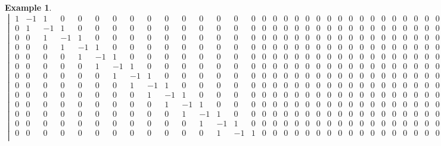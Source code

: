 \documentclass{article}
\newtheorem*{Definition: Sylvester Matrix}{Definition}
\newtheorem*{Definition: Resultant 1}{Definition 1}
\newtheorem*{Definition: Resultant 2}{Definition 2}
\newtheorem*{Theorem: Resultant proves shared roots}{Theorem 1}
\newtheorem*{Theorem: Minimal polynomial for beta}{Theorem 2}
\newtheorem*{Example: Sylvester Matrix Ex}{Example}
\newtheorem*{Theorem: Roots}{Theorem}
\newtheorem*{Corollary: Discriminant}{Corollary}
\newtheorem*{Theorem: Rational Root Theorem}{Theorem}
\newtheorem*{Corollary: Cubic Irreducibility}{Corollary}
\newtheorem*{Theorem: Eisenstein Criterion}{Theorem}
\newtheorem*{Theorem: mod p Test}{Theorem}
\newtheorem*{Theorem: Rabin's algorithm}{Theorem}
\newtheorem*{Theorem: gcd finite field}{Theorem}
\newtheorem*{Theorem: Gauss Irreducibles}{Theorem}
\newtheorem*{Theorem: Number of irreducibles}{Theorem}
\newtheorem*{Example: All irreducibles in Z_2}{Example}
\newtheorem*{Formula: Minimal polynomial for r root of a}{Formula 1}
\newtheorem*{Example: minimal polynomial for sqrt(p)}{Example}
\newtheorem*{Example: Golden Ratio}{Example}
\newtheorem*{Formula: Minimal polynomial for a+b}{Formula 2}
\newtheorem*{Example: 1 + sqrt(3)}{Example}
\newtheorem*{Example: cubic root of unity}{Example}
\newtheorem*{Formula: Minimal polynomial for a/b}{Formula 3}
\newtheorem*{Formula: Minimal polynomial for ab}{Formula 4}
\newtheorem*{Example: cubrt(4)/i+1}{Example}
\newtheorem*{Example: 5zeta}{Example}
\newtheorem*{Example: Wild one}{Example}
\begin{document}
\begin{Example: Wild one}
$$\begin{vmatrix}
 1 &  -1 &  1 &  0 &  0 &  0 &  0 &  0 &  0 &  0 &  0 &  0 &  0 &  0 &  0 &  0 &  0 &  0 &  0 &  0 &  0 &  0 &  0 &  0 &  0 &  0 &  0 &  0 &  0 &  0 &  0 &  0\\
 0 &  1 &  -1 &  1 &  0 &  0 &  0 &  0 &  0 &  0 &  0 &  0 &  0 &  0 &  0 &  0 &  0 &  0 &  0 &  0 &  0 &  0 &  0 &  0 &  0 &  0 &  0 &  0 &  0 &  0 &  0 &  0\\
 0 &  0 &  1 &  -1 &  1 &  0 &  0 &  0 &  0 &  0 &  0 &  0 &  0 &  0 &  0 &  0 &  0 &  0 &  0 &  0 &  0 &  0 &  0 &  0 &  0 &  0 &  0 &  0 &  0 &  0 &  0 &  0\\
 0 &  0 &  0 &  1 &  -1 &  1 &  0 &  0 &  0 &  0 &  0 &  0 &  0 &  0 &  0 &  0 &  0 &  0 &  0 &  0 &  0 &  0 &  0 &  0 &  0 &  0 &  0 &  0 &  0 &  0 &  0 &  0\\
 0 &  0 &  0 &  0 &  1 &  -1 &  1 &  0 &  0 &  0 &  0 &  0 &  0 &  0 &  0 &  0 &  0 &  0 &  0 &  0 &  0 &  0 &  0 &  0 &  0 &  0 &  0 &  0 &  0 &  0 &  0 &  0\\
 0 &  0 &  0 &  0 &  0 &  1 &  -1 &  1 &  0 &  0 &  0 &  0 &  0 &  0 &  0 &  0 &  0 &  0 &  0 &  0 &  0 &  0 &  0 &  0 &  0 &  0 &  0 &  0 &  0 &  0 &  0 &  0\\
 0 &  0 &  0 &  0 &  0 &  0 &  1 &  -1 &  1 &  0 &  0 &  0 &  0 &  0 &  0 &  0 &  0 &  0 &  0 &  0 &  0 &  0 &  0 &  0 &  0 &  0 &  0 &  0 &  0 &  0 &  0 &  0\\
 0 &  0 &  0 &  0 &  0 &  0 &  0 &  1 &  -1 &  1 &  0 &  0 &  0 &  0 &  0 &  0 &  0 &  0 &  0 &  0 &  0 &  0 &  0 &  0 &  0 &  0 &  0 &  0 &  0 &  0 &  0 &  0\\
 0 &  0 &  0 &  0 &  0 &  0 &  0 &  0 &  1 &  -1 &  1 &  0 &  0 &  0 &  0 &  0 &  0 &  0 &  0 &  0 &  0 &  0 &  0 &  0 &  0 &  0 &  0 &  0 &  0 &  0 &  0 &  0\\
 0 &  0 &  0 &  0 &  0 &  0 &  0 &  0 &  0 &  1 &  -1 &  1 &  0 &  0 &  0 &  0 &  0 &  0 &  0 &  0 &  0 &  0 &  0 &  0 &  0 &  0 &  0 &  0 &  0 &  0 &  0 &  0\\
 0 &  0 &  0 &  0 &  0 &  0 &  0 &  0 &  0 &  0 &  1 &  -1 &  1 &  0 &  0 &  0 &  0 &  0 &  0 &  0 &  0 &  0 &  0 &  0 &  0 &  0 &  0 &  0 &  0 &  0 &  0 &  0\\
 0 &  0 &  0 &  0 &  0 &  0 &  0 &  0 &  0 &  0 &  0 &  1 &  -1 &  1 &  0 &  0 &  0 &  0 &  0 &  0 &  0 &  0 &  0 &  0 &  0 &  0 &  0 &  0 &  0 &  0 &  0 &  0\\
 0 &  0 &  0 &  0 &  0 &  0 &  0 &  0 &  0 &  0 &  0 &  0 &  1 &  -1 &  1 &  0 &  0 &  0 &  0 &  0 &  0 &  0 &  0 &  0 &  0 &  0 &  0 &  0 &  0 &  0 &  0 &  0\\

\end{vmatrix}$$
\end{Example: Wild one}
\end{document}
